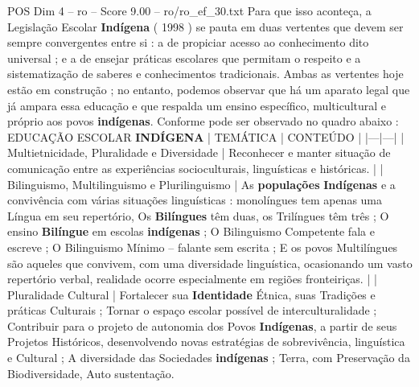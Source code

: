 \begin{textsample}{POS Dim 4 – ro – Score 9.00 – ro/ro\_ef\_30.txt}
Para que isso aconteça, a Legislação Escolar \textbf{Indígena} ( 1998 ) se pauta em duas vertentes que devem ser sempre convergentes entre si : a de propiciar acesso ao conhecimento dito universal ; e a de ensejar práticas escolares que permitam o respeito e a sistematização de saberes e conhecimentos tradicionais.
Ambas as vertentes hoje estão em construção ; no entanto, podemos observar que há um aparato legal que já ampara essa educação e que respalda um ensino específico, multicultural e próprio aos povos \textbf{indígenas}.
Conforme pode ser observado no quadro abaixo : EDUCAÇÃO ESCOLAR \textbf{INDÍGENA} | TEMÁTICA | CONTEÚDO | |---|---| | Multietnicidade, Pluralidade e Diversidade | Reconhecer e manter situação de comunicação entre as experiências socioculturais, linguísticas e históricas. | | Bilinguismo, Multilinguismo e Plurilinguismo | As \textbf{populações} \textbf{Indígenas} e a convivência com várias situações linguísticas : monolíngues tem apenas uma Língua em seu repertório, Os \textbf{Bilíngues} têm duas, os Trilíngues têm três ; O ensino \textbf{Bilíngue} em escolas \textbf{indígenas} ; O Bilinguismo Competente fala e escreve ; O Bilinguismo Mínimo – falante sem escrita ; E os povos Multilíngues são aqueles que convivem, com uma diversidade linguística, ocasionando um vasto repertório verbal, realidade ocorre especialmente em regiões fronteiriças. | | Pluralidade Cultural | Fortalecer sua \textbf{Identidade} Étnica, suas Tradições e práticas Culturais ; Tornar o espaço escolar possível de interculturalidade ; Contribuir para o projeto de autonomia dos Povos \textbf{Indígenas}, a partir de seus Projetos Históricos, desenvolvendo novas estratégias de sobrevivência, linguística e Cultural ; A diversidade das Sociedades \textbf{indígenas} ; Terra, com Preservação da Biodiversidade, Auto sustentação.

\end{textsample}
